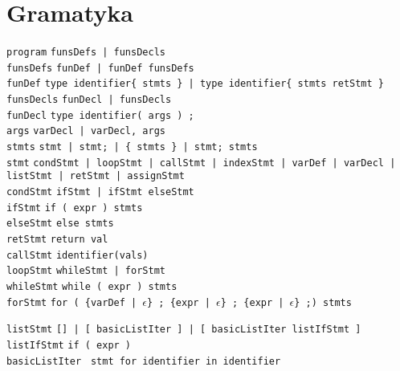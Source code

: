 \documentclass{article}
\newcommand{\keyword}[1]{\colorbox{light-gray}{\texttt{#1}}}
\newcommand{\code}[1]{\texttt{#1}}
\begin{document}
\section{Gramatyka}
\code{program} \textrightarrow \code{funsDefs | funsDecls} \\
\code{funsDefs} \textrightarrow \code{funDef | funDef funsDefs} \\
\code{funDef} \textrightarrow \code{type identifier\{ stmts \} | type identifier\{ stmts retStmt \}} \\
\code{funsDecls} \textrightarrow \code{funDecl | funsDecls} \\
\code{funDecl} \textrightarrow \code{type identifier( args ) \keyword{;}} \\
\code{args} \textrightarrow \code{varDecl | varDecl, args} \\
\code{stmts} \textrightarrow \code{stmt | stmt\keyword{;} | \keyword{\{} stmts \keyword{\}} | stmt\keyword{;} stmts} \\
\code{stmt} \textrightarrow \code{condStmt | loopStmt | callStmt | indexStmt | varDef | varDecl | listStmt | retStmt | assignStmt} \\

\code{condStmt} \textrightarrow \code{ifStmt | ifStmt elseStmt} \\
\code{ifStmt} \textrightarrow \code{\keyword{if (} expr \keyword{)} stmts } \\
\code{elseStmt} \textrightarrow \code{\keyword{else} stmts} \\
\code{retStmt} \textrightarrow \code{\keyword{return} val} \\
\code{callStmt} \textrightarrow \code{identifier\keyword{(}vals\keyword{)}} \\

\code{loopStmt} \textrightarrow \code{whileStmt | forStmt} \\
\code{whileStmt} \textrightarrow \code{\keyword{while (} expr \keyword{)} stmts} \\
\code{forStmt} \textrightarrow \code{\keyword{for (} \{varDef | $\epsilon$\} \keyword{;} \{expr | $\epsilon$\} \keyword{;} \{expr | $\epsilon$\} \keyword{;)} stmts}

\code{listStmt} \textrightarrow \code{\keyword{[]} | \keyword{[} basicListIter \keyword{]} | \keyword{[} basicListIter listIfStmt \keyword{]} } \\
\code{listIfStmt} \textrightarrow \code{\keyword{if (} expr \keyword{)}} \\
\code{basicListIter} \textrightarrow \code{ stmt \keyword{for} identifier \keyword{in} identifier} \\
\end{document}
